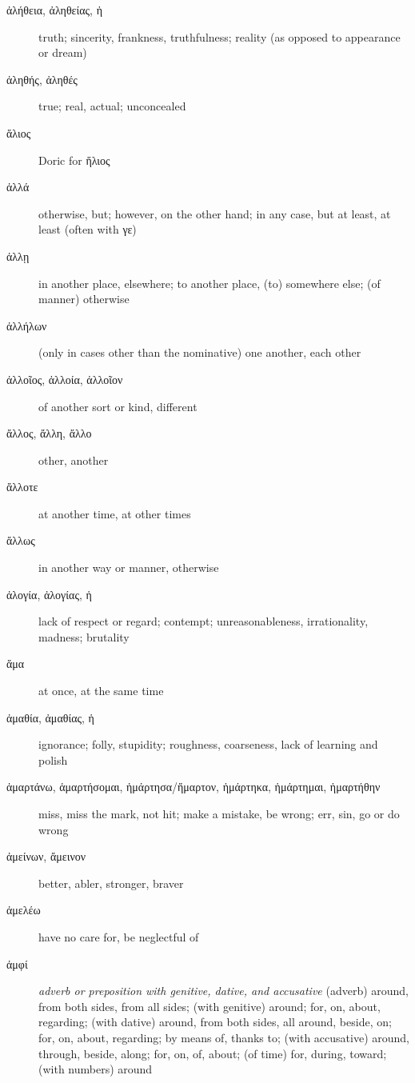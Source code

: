 \documentclass[12pt,letterpaper]{article}
\begin{document}
\begin{description}
    \item[\textgreek{ἀλήθεια, ἀληθείας, ἡ}] \marginnote{*}truth; sincerity, frankness, truthfulness; reality (as opposed to appearance or dream)
    \item[\textgreek{ἀληθής, ἀληθές}] \marginnote{*}true; real, actual; unconcealed
    \item[\textgreek{ἅλιος}] Doric for \textgreek{ἥλιος}
    \item[\textgreek{ἀλλά}] otherwise, but; however, on the other hand; in any case, but at least, at least (often with \textgreek{γε})
    \item[\textgreek{ἀλλῃ}] in another place, elsewhere; to another place, (to) somewhere else; (of manner) otherwise
    \item[\textgreek{ἀλλήλων}] \marginnote{*}(only in cases other than the nominative) one another, each other
    \item[\textgreek{ἀλλοῖος, ἀλλοία, ἀλλοῖον}] of another sort or kind, different
    \item[\textgreek{ἄλλος, ἄλλη, ἄλλο}] \marginnote{*}other, another
    \item[\textgreek{ἄλλοτε}] at another time, at other times
    \item[\textgreek{ἄλλως}] \marginnote{*}in another way or manner, otherwise
    \item[\textgreek{ἀλογία, ἀλογίας, ἡ}] lack of respect or regard; contempt; unreasonableness, irrationality, madness; brutality
    \item[\textgreek{ἅμα}] \marginnote{*}at once, at the same time
    \item[\textgreek{ἀμαθία, ἀμαθίας, ἡ}] ignorance; folly, stupidity; roughness, coarseness, lack of learning and polish
    \item[\textgreek{ἁμαρτάνω, ἁμαρτήσομαι, ἡμάρτησα/ἥμαρτον, ἡμάρτηκα, ἡμάρτημαι, ἡμαρτήθην}] \marginnote{*}miss, miss the mark, not hit; make a mistake, be wrong; err, sin, go or do wrong
    \item[\textgreek{ἀμείνων, ἄμεινον}] \marginnote{*}better, abler, stronger, braver
    \item[\textgreek{ἀμελέω}] have no care for, be neglectful of
    \item[\textgreek{ἀμφί}] \marginnote{*}\textit{adverb or preposition with genitive, dative, and accusative} (adverb) around, from both sides, from all sides; (with genitive) around; for, on, about, regarding; (with dative) around, from both sides, all around, beside, on; for, on, about, regarding; by means of, thanks to; (with accusative) around, through, beside, along; for, on, of, about; (of time) for, during, toward; (with numbers) around

\end{description}
\end{document}
